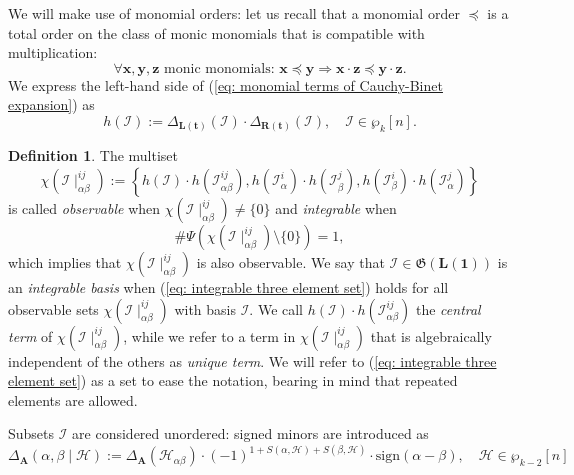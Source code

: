 \documentclass[10pt]{article}
\theoremstyle{remark}%
\theoremstyle{definition}%
\newtheorem{defn}{Definition}%
\begin{document}
We will make use of monomial orders: let us recall that a monomial order $\preceq$ is a total order on the class of monic monomials that is compatible with multiplication:  
 \begin{equation}
\forall\mathbf{x},\mathbf{y},\mathbf{z}\text{ monic monomials}:\,\mathbf{x}\preceq\mathbf{y}\Rightarrow\mathbf{x}\cdot\mathbf{z}\preceq\mathbf{y}\cdot\mathbf{z}.
\label{eq: monomial order compatibility with multiplication}
 \end{equation}
We express the left-hand side of (\ref{eq: monomial terms of Cauchy-Binet expansion}) as  
\begin{equation}
h(\mathcal{I}) :=  \Delta_{\mathbf{L}(\mathbf{t})}(\mathcal{I})\cdot\Delta_{\mathbf{R}(\mathbf{t})}(\mathcal{I}),\quad\mathcal{I}\in\wp_{k}[n].
\label{eq: notation exponential terms}
\end{equation}
\begin{defn} 
\label{def: observable sets} 
The multiset 
 \begin{equation}
\chi(\mathcal{I}\mid_{\alpha\beta}^{ij}):=\left\{ h(\mathcal{I})\cdot h(\mathcal{I}_{\alpha\beta}^{ij}),h(\mathcal{I}_{\alpha}^{i})\cdot h(\mathcal{I}_{\beta}^{j}),h(\mathcal{I}_{\beta}^{i})\cdot h(\mathcal{I}_{\alpha}^{j})\right\} \label{eq: three-terms set}
 \end{equation}
is called \emph{observable} when $\chi(\mathcal{I}\mid_{\alpha\beta}^{ij})\neq\{0\}$ and \emph{integrable} when 
 \begin{equation}
\#\Psi\left(\chi(\mathcal{I}\mid_{\alpha\beta}^{ij})\setminus\{0\}\right)=1,\label{eq: integrable three element set}
 \end{equation}
which implies that $\chi(\mathcal{I}\mid_{\alpha\beta}^{ij})$ is also observable. We say that $\mathcal{I}\in\mathfrak{G}(\mathbf{L}(\mathbf{1}))$ is an \emph{integrable basis} when (\ref{eq: integrable three element set}) holds for all observable sets $\chi(\mathcal{I}\mid_{\alpha\beta}^{ij})$ with basis $\mathcal{I}$. We call $h(\mathcal{I})\cdot h(\mathcal{I}_{\alpha\beta}^{ij})$ the \emph{central term} of $\chi(\mathcal{I}\mid_{\alpha\beta}^{ij})$, while we refer to a term in $\chi(\mathcal{I}\mid_{\alpha\beta}^{ij})$
that is algebraically independent of the others as \emph{unique term}. We will refer to (\ref{eq: integrable three element set}) as a set to ease the notation, bearing in mind that repeated elements are allowed.
\end{defn} 
Subsets $\mathcal{I}$ are considered unordered: signed minors are introduced as 
 \begin{equation}
\Delta_{\mathbf{A}}(\alpha,\beta\mid\mathcal{H}):=\Delta_{\mathbf{A}}(\mathcal{H}_{\alpha\beta})\cdot(-1)^{1+S(\alpha,\mathcal{H})+S(\beta,\mathcal{H})}\cdot\mathrm{sign}\left(\alpha-\beta\right),\quad\mathcal{H}\in\wp_{k-2}[n]\label{sign 2-2, b}
 \end{equation}
\end{document}
